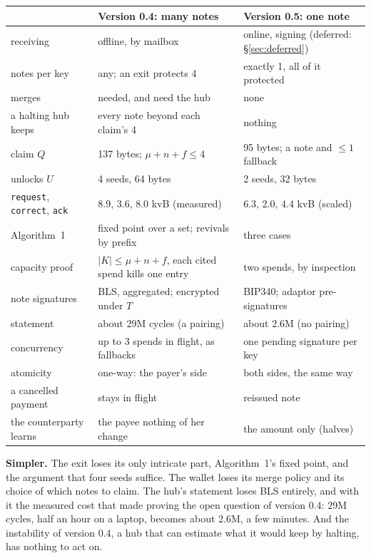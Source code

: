 \documentclass[11pt]{article}
\theoremstyle{plain}
\theoremstyle{definition}
\newcommand{\tx}[1]{\texttt{#1}}
\begin{document}
\begin{center}
\begin{tabularx}{\linewidth}{lLL}
\toprule
& Version 0.4: many notes & Version 0.5: one note \\
\midrule
receiving & offline, by mailbox & online, signing (deferred: \S\ref{sec:deferred}) \\
notes per key & any; an exit protects 4 & exactly 1, all of it protected \\
merges & needed, and need the hub & none \\
a halting hub keeps & every note beyond each claim's 4 & nothing \\
claim $Q$ & 137 bytes; $\mu + n + f \le 4$ & 95 bytes; a note and $\le 1$ fallback \\
unlocks $U$ & 4 seeds, 64 bytes & 2 seeds, 32 bytes \\
\tx{request}, \tx{correct}, \tx{ack} & 8.9, 3.6, 8.0 kvB (measured) & 6.3, 2.0, 4.4 kvB (scaled) \\
Algorithm~1 & fixed point over a set; revivals by prefix & three cases \\
capacity proof & $|K| \le \mu + n + f$, each cited spend kills one entry & two spends, by inspection \\
note signatures & BLS, aggregated; encrypted under $T$ & BIP340; adaptor pre-signatures \\
statement & about 29M cycles (a pairing) & about 2.6M (no pairing) \\
concurrency & up to 3 spends in flight, as fallbacks & one pending signature per key \\
atomicity & one-way: the payer's side & both sides, the same way \\
a cancelled payment & stays in flight & reissued note \\
the counterparty learns & the payee nothing of her change & the amount only (halves) \\
\bottomrule
\end{tabularx}
\end{center}

\textbf{Simpler.} The exit loses its only intricate part, Algorithm~1's
fixed point, and the argument that four seeds suffice. The wallet loses
its merge policy and its choice of which notes to claim. The hub's
statement loses BLS entirely, and with it the measured cost that made
proving the open question of version 0.4: 29M cycles, half an hour on a
laptop, becomes about 2.6M, a few minutes. And the instability of
version 0.4, a hub that can estimate what it would keep by halting,
has nothing to act on.
\end{document}
